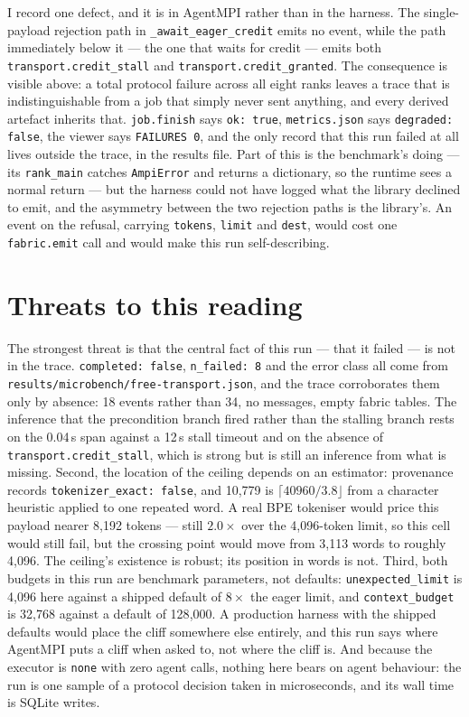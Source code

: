 \documentclass[11pt]{article}
\begin{document}
I record one defect, and it is in AgentMPI rather than in the harness. The
single-payload rejection path in \texttt{\_await\_eager\_credit} emits no event,
while the path immediately below it --- the one that waits for credit --- emits both
\texttt{transport.credit\_stall} and \texttt{transport.credit\_granted}. The
consequence is visible above: a total protocol failure across all eight ranks leaves
a trace that is indistinguishable from a job that simply never sent anything, and
every derived artefact inherits that. \texttt{job.finish} says \texttt{ok: true},
\texttt{metrics.json} says \texttt{degraded: false}, the viewer says
\texttt{FAILURES 0}, and the only record that this run failed at all lives outside
the trace, in the results file. Part of this is the benchmark's doing --- its
\texttt{rank\_main} catches \texttt{AmpiError} and returns a dictionary, so the
runtime sees a normal return --- but the harness could not have logged what the
library declined to emit, and the asymmetry between the two rejection paths is the
library's. An event on the refusal, carrying \texttt{tokens}, \texttt{limit} and
\texttt{dest}, would cost one \texttt{fabric.emit} call and would make this run
self-describing.

\section{Threats to this reading}

The strongest threat is that the central fact of this run --- that it failed --- is
not in the trace. \texttt{completed: false}, \texttt{n\_failed: 8} and the error
class all come from \texttt{results/microbench/free-transport.json}, and the trace
corroborates them only by absence: 18 events rather than 34, no messages, empty
fabric tables. The inference that the precondition branch fired rather than the
stalling branch rests on the 0.04\,s span against a 12\,s stall timeout and on the
absence of \texttt{transport.credit\_stall}, which is strong but is still an
inference from what is missing. Second, the location of the ceiling depends on an
estimator: provenance records \texttt{tokenizer\_exact: false}, and 10{,}779 is
$\lceil 40960/3.8 \rfloor$ from a character heuristic applied to one repeated word. A
real BPE tokeniser would price this payload nearer 8{,}192 tokens --- still
$2.0\times$ over the 4{,}096-token limit, so this cell would still fail, but the
crossing point would move from 3{,}113 words to roughly 4{,}096. The ceiling's
existence is robust; its position in words is not. Third, both budgets in this run
are benchmark parameters, not defaults: \texttt{unexpected\_limit} is 4{,}096 here
against a shipped default of $8 \times$ the eager limit, and
\texttt{context\_budget} is 32{,}768 against a default of 128{,}000. A production
harness with the shipped defaults would place the cliff somewhere else entirely, and
this run says where AgentMPI puts a cliff when asked to, not where the cliff is. And
because the executor is \texttt{none} with zero agent calls, nothing here bears on
agent behaviour: the run is one sample of a protocol decision taken in
microseconds, and its wall time is SQLite writes.
\end{document}
